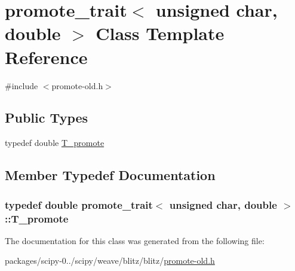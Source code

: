 \hypertarget{classpromote__trait_3_01unsigned_01char_00_01double_01_4}{}\section{promote\+\_\+trait$<$ unsigned char, double $>$ Class Template Reference}
\label{classpromote__trait_3_01unsigned_01char_00_01double_01_4}


{\ttfamily \#include $<$promote-\/old.\+h$>$}

\subsection*{Public Types}
\begin{DoxyCompactItemize}
\item 
typedef double \hyperlink{classpromote__trait_3_01unsigned_01char_00_01double_01_4_a058b84491a1bc40841695701c3e46079}{T\+\_\+promote}
\end{DoxyCompactItemize}


\subsection{Member Typedef Documentation}
\hypertarget{classpromote__trait_3_01unsigned_01char_00_01double_01_4_a058b84491a1bc40841695701c3e46079}{}
\subsubsection[{T\+\_\+promote}]{\setlength{\rightskip}{0pt plus 5cm}typedef double {\bf promote\+\_\+trait}$<$ unsigned char, double $>$\+::{\bf T\+\_\+promote}}\label{classpromote__trait_3_01unsigned_01char_00_01double_01_4_a058b84491a1bc40841695701c3e46079}


The documentation for this class was generated from the following file\+:\begin{DoxyCompactItemize}
\item 
packages/scipy-\/0../scipy/weave/blitz/blitz/\hyperlink{promote-old_8h}{promote-\/old.\+h}\end{DoxyCompactItemize}
